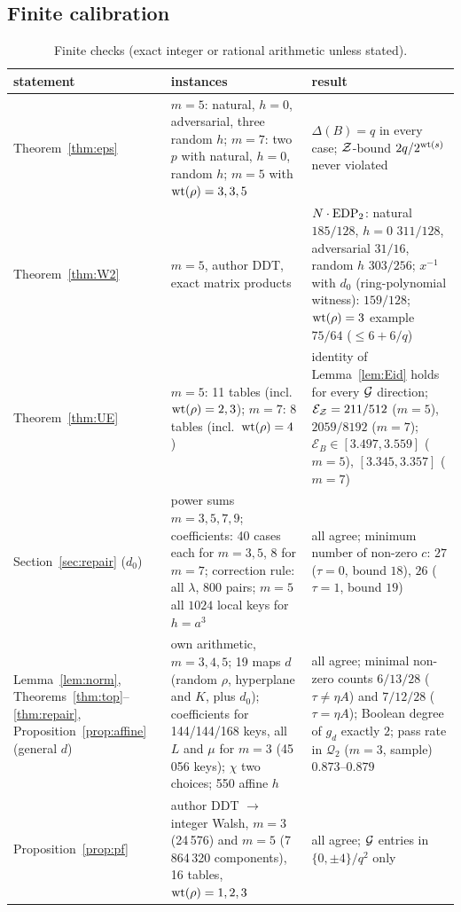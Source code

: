 \subsection{Finite calibration}
\begin{table}[p]\footnotesize
\caption{Finite checks (exact integer or rational arithmetic unless stated).}\label{tab:finite}
\begin{tabular}{p{}p{}p{}}
\toprule
statement & instances & result\\
\midrule
Theorem~\ref{thm:eps} & $m=5$: natural, $h=0$, adversarial, three random $h$; $m=7$: two $p$ with natural, $h=0$, random $h$; $m=5$ with $\mathrm{wt}(\rho)=3,3,5$ & $\Delta(B)=q$ in every case; $\mathcal{Z}$-bound $2q/2^{\mathrm{wt}(s)}$ never violated\\
Theorem~\ref{thm:W2} & $m=5$, author DDT, exact matrix products & $N\cdot\mathrm{EDP}_2$: natural $185/128$, $h=0$ $311/128$, adversarial $31/16$, random $h$ $303/256$; $x^{-1}$ with $d_0$ (ring-polynomial witness): $159/128$; $\mathrm{wt}(\rho)=3$ example $75/64$ ($\le6+6/q$)\\
Theorem~\ref{thm:UE} & $m=5$: 11 tables (incl.\ $\mathrm{wt}(\rho)=2,3$); $m=7$: 8 tables (incl.\ $\mathrm{wt}(\rho)=4$) & identity of Lemma~\ref{lem:Eid} holds for every $\mathcal{G}$ direction; $\mathcal E_{\mathcal{Z}}=211/512$ ($m=5$), $2059/8192$ ($m=7$); $\mathcal E_B\in[3.497,3.559]$ ($m=5$), $[3.345,3.357]$ ($m=7$)\\
Section~\ref{sec:repair} ($d_0$) & power sums $m=3,5,7,9$; coefficients: 40 cases each for $m=3,5$, 8 for $m=7$; correction rule: all $\lambda$, 800 pairs; $m=5$ all $1024$ local keys for $h=a^3$ & all agree; minimum number of non-zero $c$: $27$ ($\tau=0$, bound $18$), $26$ ($\tau=1$, bound $19$)\\
Lemma~\ref{lem:norm}, Theorems~\ref{thm:top}--\ref{thm:repair}, Proposition~\ref{prop:affine} (general $d$) & own arithmetic, $m=3,4,5$; 19 maps $d$ (random $\rho$, hyperplane and $K$, plus $d_0$); coefficients for 144/144/168 keys, all $L$ and $\mu$ for $m=3$ (45\,056 keys); $\chi$ two choices; 550 affine $h$ & all agree; minimal non-zero counts $6/13/28$ ($\tau\ne\eta A$) and $7/12/28$ ($\tau=\eta A$); Boolean degree of $g_d$ exactly $2$; pass rate in $\mathcal Q_2$ ($m=3$, sample) $0.873$--$0.879$\\
Proposition~\ref{prop:pf} & author DDT $\to$ integer Walsh, $m=3$ (24\,576) and $m=5$ (7\,864\,320 components), 16 tables, $\mathrm{wt}(\rho)=1,2,3$ & all agree; $\mathcal{G}$ entries in $\{0,\pm4\}/q^2$ only\\
\bottomrule
\end{tabular}
\end{table}
